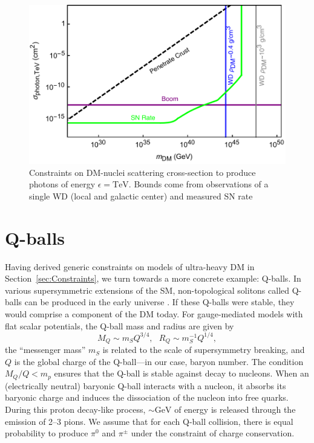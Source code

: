 \documentclass[twocolumn,preprintnumbers,amsmath,amssymb,prd, superscriptaddress]{revtex4} %
\begin{document}
\begin{figure}
\includegraphics[scale=.45]{transitobservation.pdf}
\caption{Constraints on DM-nuclei scattering cross-section to produce photons of energy $\epsilon = \text{TeV}$. Bounds come from observations of a single WD (local and galactic center) and measured SN rate}
\label{fig:transitclasses}
\end{figure}

\section{Q-balls}
\label{sec:QBalls}

Having derived generic constraints on models of ultra-heavy DM in Section~\ref{sec:Constraints}, we turn towards a more concrete example: Q-balls.
In various supersymmetric extensions of the SM, non-topological solitons called Q-balls can be produced in the early universe \cite{Coleman:1985ki, Kusenko:1997si}.
If these Q-balls were stable, they would comprise a component of the DM today.
For gauge-mediated models with flat scalar potentials, the Q-ball mass and radius are given by
\begin{equation}
\label{eq:Qballprop}
M_Q \sim m_S Q^{3/4}, ~~~ R_Q \sim m_S^{-1} Q^{1/4},
\end{equation}
the ``messenger mass'' $m_S$ is related to the scale of supersymmetry breaking, and $Q$ is the global charge of the Q-ball---in our case, baryon number.
The condition $M_Q/Q < m_p$ ensures that the Q-ball is stable against decay to nucleons.
When an (electrically neutral) baryonic Q-ball interacts with a nucleon, it absorbs its baryonic charge and induces the dissociation of the nucleon into free quarks.
During this proton decay-like process, $\sim \text{GeV}$ of energy is released through the emission of 2--3 pions.
We assume that for each Q-ball collision, there is equal probability to produce $\pi^0$ and $\pi^\pm$ under the constraint of charge conservation.
\end{document}

